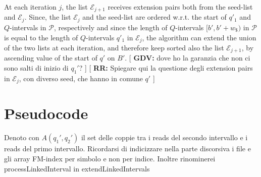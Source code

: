 \documentclass[runningheads,envcountsame,a4paper]{llncs}
\newcommand{\notaestesa}[2]{%
 \marginpar{\color{red!75!black}\textbf{\texttimes}}%
 {\color{red!75!black}%
 [\,\textbullet\,\textsf{\textbf{#1:}} %
 \textsf{\footnotesize#2}\,\textbullet\,]}%
}
\begin{document}
At each iteration $j$, the list $\mathcal{E}_{j+1}$ receives extension
pairs both from the seed-list  and $\mathcal{E}_{j}$.
Since, the list  $\mathcal{E}_{j}$  and the seed-list are ordered w.r.t. the start of  $q'_1$ and $Q$-intervals in $\mathcal{P}$, respectively and since the  length of $Q$-intervals $[b', b'+w_\$)$ in $\mathcal{P}$ is
equal to the length  of  $Q$-intervals $q'_1$ in $\mathcal{E}_{j}$, the
algorithm can extend the union of the two lists at each iteration, and therefore keep
sorted also the list $\mathcal{E}_{j+1}$, by ascending value of the
start of $q'$ on $B'$.\notaestesa{GDV}{ dove ho la
  garanzia che non ci sono salti di inizio di $q_{1}'$?} \notaestesa{RR}{Spiegare qui la questione degli extension pairs in $\mathcal{E}_j$, con diverso seed, che hanno in comune $q'$}









\section*{Pseudocode}
Denoto con $A(q_{1}', q_{2}')$ il set delle coppie tra i reads del secondo intervallo e i reads del primo intervallo.
Ricordarsi di indicizzare nella parte discorsiva i file e gli array FM-index per simbolo e non per indice.
Inoltre rinominerei processLinkedInterval in extendLinkedIntervals
\end{document}
